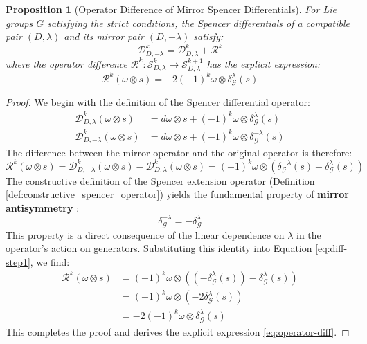 \documentclass[a4paper,12pt]{extarticle}
\newtheorem{proposition}[theorem]{Proposition}
\theoremstyle{definition}
\begin{document}
\begin{proposition}[Operator Difference of Mirror Spencer Differentials]
For Lie groups $G$ satisfying the strict conditions, the Spencer differentials of a compatible pair $(D,\lambda)$ and its mirror pair $(D,-\lambda)$ satisfy:
\begin{equation}\label{eq:spencer-diff-mirror}
\mathcal{D}^k_{D,-\lambda} = \mathcal{D}^k_{D,\lambda} + \mathcal{R}^k
\end{equation}
where the operator difference $\mathcal{R}^k: \mathcal{S}^k_{D,\lambda} \to \mathcal{S}^{k+1}_{D,\lambda}$ has the explicit expression:
\begin{equation}\label{eq:operator-diff}
\mathcal{R}^k(\omega \otimes s) = -2(-1)^k \omega \otimes \delta^{\lambda}_{\mathcal{G}}(s)
\end{equation}
\end{proposition}

\begin{proof}
We begin with the definition of the Spencer differential operator:
\begin{align*}
    \mathcal{D}^k_{D,\lambda}(\omega \otimes s) &= d\omega \otimes s + (-1)^k \omega \otimes \delta^{\lambda}_{\mathcal{G}}(s) \\
    \mathcal{D}^k_{D,-\lambda}(\omega \otimes s) &= d\omega \otimes s + (-1)^k \omega \otimes \delta^{-\lambda}_{\mathcal{G}}(s)
\end{align*}
The difference between the mirror operator and the original operator is therefore:
\begin{equation}\label{eq:diff-step1}
\mathcal{R}^k(\omega \otimes s) = \mathcal{D}^k_{D,-\lambda}(\omega \otimes s) - \mathcal{D}^k_{D,\lambda}(\omega \otimes s) = (-1)^k \omega \otimes \left(\delta^{-\lambda}_{\mathcal{G}}(s) - \delta^{\lambda}_{\mathcal{G}}(s)\right)
\end{equation}
The constructive definition of the Spencer extension operator (Definition \ref{def:constructive_spencer_operator}) yields the fundamental property of \textbf{mirror antisymmetry} \cite{zheng2025geometric}:
\begin{equation}\label{eq:mirror-antisymmetry}
\delta^{-\lambda}_{\mathcal{G}} = -\delta^{\lambda}_{\mathcal{G}}
\end{equation}
This property is a direct consequence of the linear dependence on $\lambda$ in the operator's action on generators. Substituting this identity into Equation \eqref{eq:diff-step1}, we find:
\begin{align*}
\mathcal{R}^k(\omega \otimes s) &= (-1)^k \omega \otimes \left((-\delta^{\lambda}_{\mathcal{G}}(s)) - \delta^{\lambda}_{\mathcal{G}}(s)\right) \\
&= (-1)^k \omega \otimes (-2\delta^{\lambda}_{\mathcal{G}}(s)) \\
&= -2(-1)^k \omega \otimes \delta^{\lambda}_{\mathcal{G}}(s)
\end{align*}
This completes the proof and derives the explicit expression \eqref{eq:operator-diff}.
\end{proof}
\end{document}
